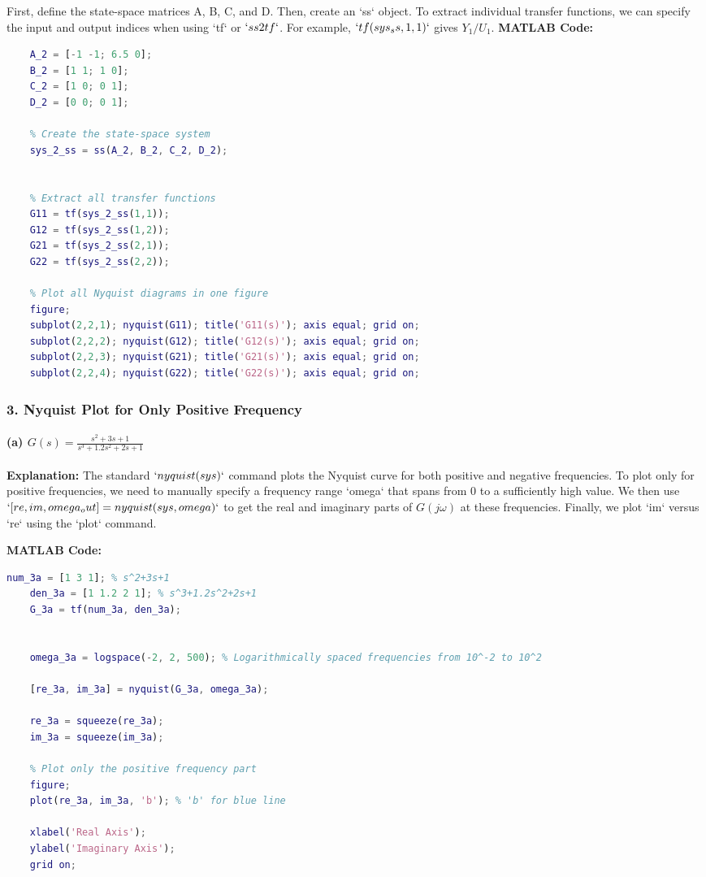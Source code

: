 \documentclass[a4paper,12pt]{article}
\begin{document}
	First, define the state-space matrices A, B, C, and D. Then, create an `ss` object. To extract individual transfer functions, we can specify the input and output indices when using `tf` or $`ss2tf`$. For example, $`tf(sys_ss, 1, 1)`$ gives $Y_1/U_1$.
	\newpage
	\textbf{MATLAB Code:}
	\begin{lstlisting}[language=Matlab, caption=MATLAB Code for Problem 2]
	% Define state-space matrices
	A_2 = [-1 -1; 6.5 0];
	B_2 = [1 1; 1 0];
	C_2 = [1 0; 0 1];
	D_2 = [0 0; 0 1];
	
	% Create the state-space system
	sys_2_ss = ss(A_2, B_2, C_2, D_2);
	
	
	% Extract all transfer functions
	G11 = tf(sys_2_ss(1,1));
	G12 = tf(sys_2_ss(1,2));
	G21 = tf(sys_2_ss(2,1));
	G22 = tf(sys_2_ss(2,2));
	
	% Plot all Nyquist diagrams in one figure
	figure;
	subplot(2,2,1); nyquist(G11); title('G11(s)'); axis equal; grid on;
	subplot(2,2,2); nyquist(G12); title('G12(s)'); axis equal; grid on;
	subplot(2,2,3); nyquist(G21); title('G21(s)'); axis equal; grid on;
	subplot(2,2,4); nyquist(G22); title('G22(s)'); axis equal; grid on;
	\end{lstlisting}
	
	\subsubsection*{3. Nyquist Plot for Only Positive Frequency}
	
	\paragraph{(a) $G(s)=\frac{s^2+3s+1}{s^3+1.2s^2+2s+1}$}
	\textbf{Explanation:}
	The standard $ `nyquist(sys)`$ command plots the Nyquist curve for both positive and negative frequencies. To plot only for positive frequencies, we need to manually specify a frequency range `omega` that spans from $0$ to a sufficiently high value. We then use $ `[re, im, omega_out] = nyquist(sys, omega)`$ to get the real and imaginary parts of $G(j\omega)$ at these frequencies. Finally, we plot `im` versus `re` using the `plot` command.
	
	\textbf{MATLAB Code:}
	\begin{lstlisting}[language=Matlab, caption=MATLAB Code for Problem 3(a)]
		num_3a = [1 3 1]; % s^2+3s+1
	den_3a = [1 1.2 2 1]; % s^3+1.2s^2+2s+1
	G_3a = tf(num_3a, den_3a);
	
	
	omega_3a = logspace(-2, 2, 500); % Logarithmically spaced frequencies from 10^-2 to 10^2
	
	[re_3a, im_3a] = nyquist(G_3a, omega_3a);
	
	re_3a = squeeze(re_3a);
	im_3a = squeeze(im_3a);
	
	% Plot only the positive frequency part
	figure;
	plot(re_3a, im_3a, 'b'); % 'b' for blue line
	
	xlabel('Real Axis');
	ylabel('Imaginary Axis');
	grid on;
	\end{lstlisting}
	
\end{document}
